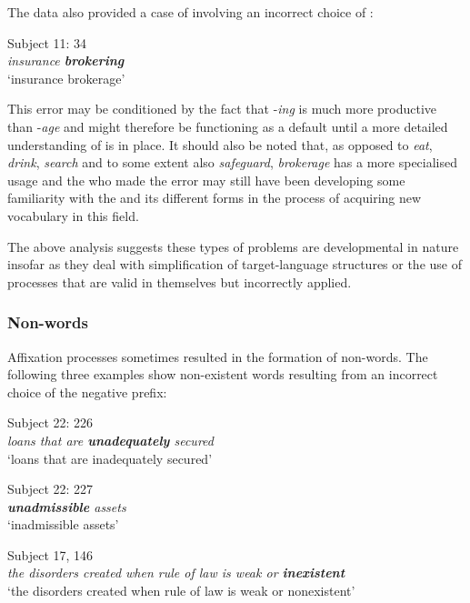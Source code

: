 \documentclass[output=paper]{langsci/langscibook}
\begin{document}
The data also provided a case of  involving an incorrect choice of :

\begin{exe}  
  \ex{}
  {Subject 11: 34}\\
    \textit{insurance \textbf{brokering}}\\
    {‘insurance brokerage’}
  \label{ex4}
\end{exe}

This error may be conditioned by the fact that -\textit{ing} is much
more productive than -\textit{age} and might therefore be functioning
as a default  until a more detailed understanding of 
is in place. It should also be noted that, as opposed to \textit{eat},
\textit{drink}, \textit{search} and to some extent also
\textit{safeguard}, \textit{brokerage} has a more specialised usage
and the  who made the error may still have been developing some
familiarity with the  and its different forms in the process of
acquiring new vocabulary in this field.

The above analysis suggests these types of problems are developmental
in nature insofar as they deal with simplification of target-language
structures or the use of  processes that are valid in
themselves but incorrectly applied.

\subsubsection{Non-words}

Affixation processes sometimes resulted in the formation of
non-words. The following three examples show non-existent words
resulting from an incorrect choice of the negative prefix:


\begin{exe}  
  \ex{}
  {Subject 22: 226}\\
    \textit{loans that are \textbf{unadequately} secured}\\
    {‘loans that are inadequately secured’}
  \label{ex5}
\end{exe}


\begin{exe}  
  \ex{}
  {Subject 22: 227}\\
    \textit{\textbf{unadmissible} assets}\\
    {‘inadmissible assets’}
  \label{ex6}
\end{exe}


\begin{exe}  
  \ex{}
  {Subject 17, 146}\\
    \textit{the disorders created when rule of law is weak or \textbf{inexistent}}\\
    {‘the disorders created when rule of law is weak or nonexistent’}
  \label{ex7}
\end{exe}
\end{document}
